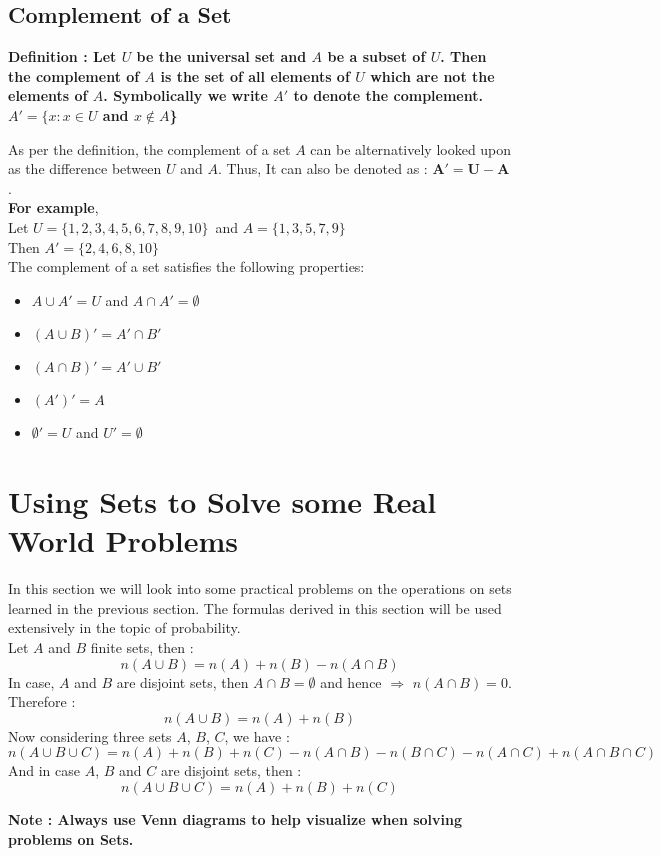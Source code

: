 \documentclass[12pt, letterpaper]{article}
\begin{document}
\subsection{Complement of a Set}
\begin{displayquote}
\textbf{ Definition : Let $U$ be the universal set and $A$ be a subset of $U$. Then the complement of $A$ is the set of all elements of $U$ which are not the elements of $A$. Symbolically we write $A'$ to denote the complement. $A' = \{ x : x \in U$ and $x \notin A$\}}
\end{displayquote}
As per the definition, the complement of a set $A$ can be alternatively looked upon as the difference between $U$ and $A$. Thus, It can also be denoted as : $\mathbf{A' = U-A}$.\\
\textbf{For example},\\ 
Let $U = \{1,2,3,4,5,6,7,8,9,10\}$\ and $A = \{1,3,5,7,9\}$\\
Then $A' = \{2,4,6,8,10\}$\\
The complement of a set satisfies the following properties: 
\begin{itemize}
    \item $A \cup A' = U$ and $A \cap A' = \emptyset$
    \item $(A \cup B)' = A' \cap B'$
    \item $(A \cap B)' = A' \cup B'$
    \item $(A')' = A$
    \item $\emptyset' = U$ and $U' = \emptyset$
\end{itemize}

\section{Using Sets to Solve some Real World Problems}
In this section we will look into some practical problems on the operations on sets learned in the previous section. The formulas derived in this section will be used extensively in the topic of probability.\\
Let $A$ and $B$ finite sets, then :
\begin{equation}
    n(A \cup B) = n(A) + n(B) - n(A \cap B)
\end{equation}
In case, $A$ and $B$ are disjoint sets, then $A \cap B = \emptyset$ and hence $\Rightarrow$ $n(A \cap B) = 0$. Therefore : 
\begin{equation}
    n(A \cup B) = n(A) + n(B)
\end{equation}
Now considering three sets $A$, $B$, $C$, we have : 
\begin{equation}
    n(A \cup B \cup C) = n(A) + n(B) + n(C) - n(A \cap B) - n(B \cap C) - n(A \cap C) + n(A \cap B \cap C)
\end{equation}
And in case $A$, $B$ and $C$ are disjoint sets, then : 
\begin{equation}
    n(A \cup B \cup C) = n(A) + n(B) + n(C)
\end{equation}
\begin{displayquote}
\textbf{Note : Always use Venn diagrams to help visualize when solving problems on Sets.}
\end{displayquote}
\end{document}

